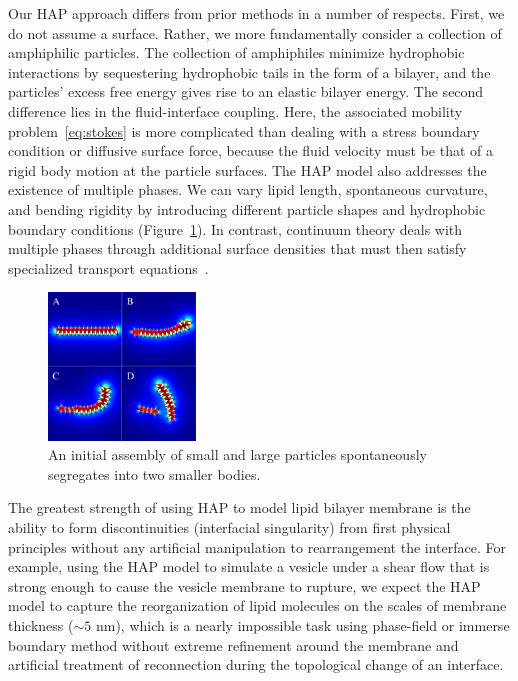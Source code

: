 



Our HAP approach differs from prior methods in a number of respects.
First, we do not assume a surface. Rather, we more fundamentally
consider a collection of amphiphilic particles.  The collection of
amphiphiles minimize hydrophobic interactions by sequestering
hydrophobic tails in the form of a bilayer, and the particles' excess
free energy gives rise to an elastic bilayer energy. The second
difference lies in the fluid-interface coupling. Here, the associated
mobility problem~\eqref{eq:stokes} is more complicated than dealing with
a stress boundary condition or diffusive surface force, because the
fluid velocity must be that of a rigid body motion at the particle
surfaces. The HAP model also addresses the existence of multiple phases.
We can vary lipid length, spontaneous curvature, and bending rigidity by
introducing different particle shapes and hydrophobic boundary
conditions (Figure~\ref{fig:demixing}). In contrast, continuum theory
deals with multiple phases through additional surface densities that
must then satisfy specialized transport equations~\cite{Lowengrub07,
MikuckiZhou17}. 
%
\begin{figure}
\centerline{\includegraphics[width=0.35\textwidth]{figures/PW_fig2.pdf}}
  \vspace{-8pt}
  \caption{\label{fig:demixing} \footnotesize An initial assembly of
  small and large particles spontaneously segregates into two smaller
  bodies.}
\end{figure}
The greatest strength of using HAP to model lipid bilayer membrane is
the ability to form discontinuities (interfacial singularity) from first
physical principles without any artificial manipulation to rearrangement
the interface. For example, using the HAP model to simulate a vesicle
under a shear flow that is strong enough to cause the vesicle membrane
to rupture, we expect the HAP model to capture the reorganization of
lipid molecules on the scales of membrane thickness ($\sim 5$ nm), which
is a nearly impossible task using phase-field or immerse boundary method
without extreme refinement around the membrane and artificial treatment
of reconnection during the topological change of an interface.


